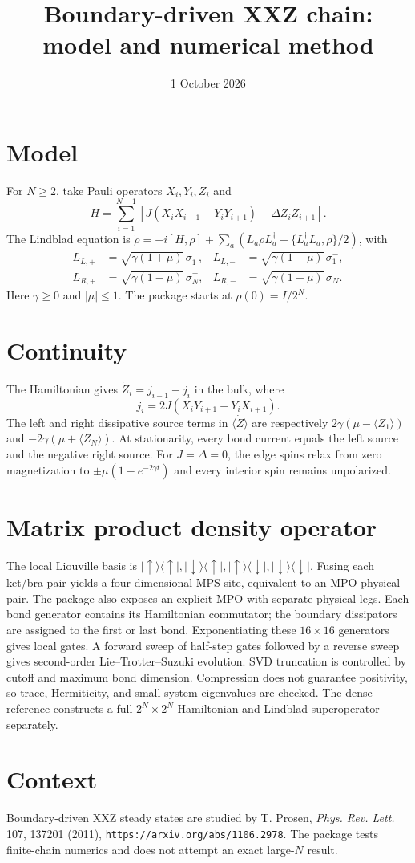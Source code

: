 \documentclass[11pt]{article}
\title{Boundary-driven XXZ chain: model and numerical method}
\date{1 October 2026}
\begin{document}
\maketitle
\section*{Model}
For $N\geq2$, take Pauli operators $X_i,Y_i,Z_i$ and
\begin{equation}
H=\sum_{i=1}^{N-1}\left[J(X_iX_{i+1}+Y_iY_{i+1})+
\Delta Z_iZ_{i+1}\right].
\end{equation}
The Lindblad equation is $\dot\rho=-i[H,\rho]+\sum_a
(L_a\rho L_a^\dagger-\{L_a^\dagger L_a,\rho\}/2)$, with
\begin{align}
L_{L,+}&=\sqrt{\gamma(1+\mu)}\,\sigma_1^+,&
L_{L,-}&=\sqrt{\gamma(1-\mu)}\,\sigma_1^-,\\
L_{R,+}&=\sqrt{\gamma(1-\mu)}\,\sigma_N^+,&
L_{R,-}&=\sqrt{\gamma(1+\mu)}\,\sigma_N^-.
\end{align}
Here $\gamma\geq0$ and $|\mu|\leq1$. The package starts at
$\rho(0)=I/2^N$.
\section*{Continuity}
The Hamiltonian gives $\dot Z_i=j_{i-1}-j_i$ in the bulk, where
\begin{equation}
j_i=2J(X_iY_{i+1}-Y_iX_{i+1}).
\end{equation}
The left and right dissipative source terms in $\dot{\langle Z\rangle}$
are respectively $2\gamma(\mu-\langle Z_1\rangle)$ and
$-2\gamma(\mu+\langle Z_N\rangle)$. At stationarity, every bond
current equals the left source and the negative right source.
For $J=\Delta=0$, the edge spins relax from zero magnetization to
$\pm\mu(1-e^{-2\gamma t})$ and every interior spin remains unpolarized.
\section*{Matrix product density operator}
The local Liouville basis is
$|\uparrow\rangle\langle\uparrow|,
|\downarrow\rangle\langle\uparrow|,
|\uparrow\rangle\langle\downarrow|,
|\downarrow\rangle\langle\downarrow|$.
Fusing each ket/bra pair yields a four-dimensional MPS site, equivalent
to an MPO physical pair. The package also exposes an explicit MPO with
separate physical legs. Each bond generator contains its Hamiltonian
commutator; the boundary dissipators are assigned to the first or last
bond. Exponentiating these $16\times16$ generators gives local gates.
A forward sweep of half-step gates followed by a reverse sweep gives
second-order Lie--Trotter--Suzuki evolution. SVD truncation is controlled
by cutoff and maximum bond dimension. Compression does not guarantee
positivity, so trace, Hermiticity, and small-system eigenvalues are checked.
The dense reference constructs a full $2^N\times2^N$ Hamiltonian and
Lindblad superoperator separately.
\section*{Context}
Boundary-driven XXZ steady states are studied by T. Prosen,
\emph{Phys. Rev. Lett.} 107, 137201 (2011),
\texttt{https://arxiv.org/abs/1106.2978}. The package tests finite-chain
numerics and does not attempt an exact large-$N$ result.
\end{document}
